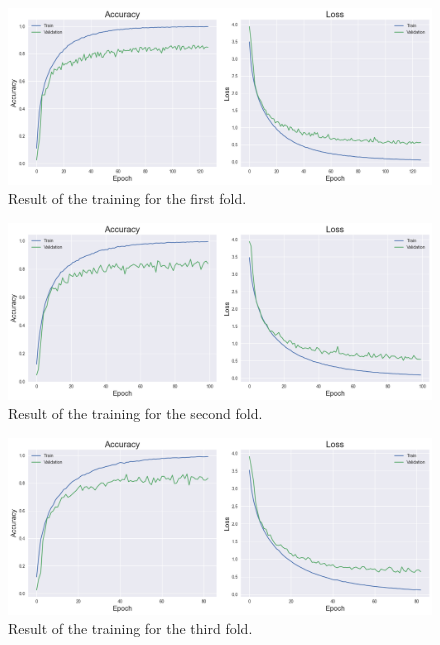 \documentclass{article}
\begin{document}
\begin{sloppy}
\begin{figure}[ht]
  \centering
  \centerline{\includegraphics[width=\columnwidth]{fold1.png}}
  \caption{Result of the training for the first fold.}
  \label{fig:fold1}
\end{figure}

\begin{figure}[ht]
  \centering
  \centerline{\includegraphics[width=\columnwidth]{fold2.png}}
  \caption{Result of the training for the second fold.}
  \label{fig:fold2}
\end{figure}

\begin{figure}[ht]
  \centering
  \centerline{\includegraphics[width=\columnwidth]{fold3.png}}
  \caption{Result of the training for the third fold.}
  \label{fig:fold3}
\end{figure}


\end{sloppy}
\end{document}
